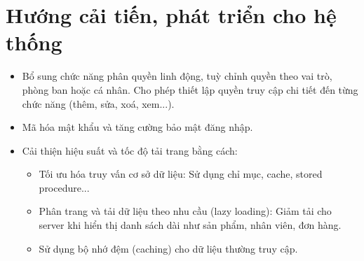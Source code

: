 \documentclass[a4paper,12pt]{report}
\begin{document}
\section{Hướng cải tiến, phát triển cho hệ thống}
\begin{itemize}
    \item Bổ sung chức năng phân quyền linh động, tuỳ chỉnh quyền theo vai trò, phòng ban hoặc cá nhân. Cho phép thiết lập quyền truy cập chi tiết đến từng chức năng (thêm, sửa, xoá, xem...).
    \item Mã hóa mật khẩu và tăng cường bảo mật đăng nhập.
    \item Cải thiện hiệu suất và tốc độ tải trang bằng cách:
    \begin{itemize}
        \item Tối ưu hóa truy vấn cơ sở dữ liệu: Sử dụng chỉ mục, cache, stored procedure...
        \item Phân trang và tải dữ liệu theo nhu cầu (lazy loading): Giảm tải cho server khi hiển thị danh sách dài như sản phẩm, nhân viên, đơn hàng.
        \item Sử dụng bộ nhớ đệm (caching) cho dữ liệu thường truy cập.
    \end{itemize}
\end{itemize}
\end{document}
